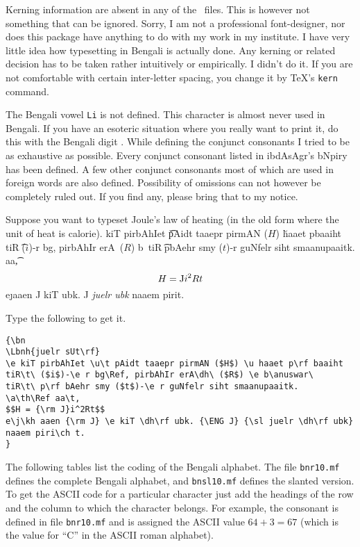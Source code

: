 Kerning information are absent in any of the \METAFONT\ files. This
is however not something that can be ignored. Sorry, I am not a professional
font-designer, nor does this package have anything to do with my work in my
institute. I have very little idea how typesetting in Bengali is actually done.
Any kerning or related decision has to be taken rather intuitively or
empirically. I didn't do it. If you are not comfortable with certain
inter-letter spacing, you change it by \TeX's {\tt \bs kern} command.

The Bengali vowel {\tt Li} is not defined. This character is almost never used
in Bengali. If you have an esoteric situation where you really want to print
it, do this with the Bengali digit {}. While defining the conjunct
consonants I tried to be as exhaustive as possible. Every conjunct
consonant listed in {\bn ibd\jf AsAgr}'s {\bn bN\Ref pir\ch y}
has been defined. A few other conjunct consonants most of which are
used in foreign words are also defined. Possibility of omissions can not
however be completely ruled out. If you find any, please bring that to
my notice.

Suppose you want to typeset Joule's law of heating (in the old form where
the unit of heat is calorie).
{\bn
{}
\e kiT pirbAhIet \u\t pAidt taaepr pirmAN ($H$) \u haaet p\rf baaiht
tiR\t\ ($i$)-\e r bg\Ref, pirbAhIr erA\dh\ ($R$) \e b\anuswar\
tiR\t\ p\rf bAehr smy ($t$)-\e r guNfelr siht smaanupaaitk.
\a\th\Ref aa\t,
$$H = {\rm J}i^2Rt$$
e\j\kh aaen {\rm J} \e kiT \dh\rf ubk. {\ENG J} {\sl juelr \dh\rf ubk}
naaem piri\ch t.
}

\noindent
Type the following to get it.
\begin{verbatim}
{\bn
\Lbnh{juelr sUt\rf}
\e kiT pirbAhIet \u\t pAidt taaepr pirmAN ($H$) \u haaet p\rf baaiht
tiR\t\ ($i$)-\e r bg\Ref, pirbAhIr erA\dh\ ($R$) \e b\anuswar\
tiR\t\ p\rf bAehr smy ($t$)-\e r guNfelr siht smaanupaaitk.
\a\th\Ref aa\t,
$$H = {\rm J}i^2Rt$$
e\j\kh aaen {\rm J} \e kiT \dh\rf ubk. {\ENG J} {\sl juelr \dh\rf ubk}
naaem piri\ch t.
}
\end{verbatim}

The following tables list the coding of the Bengali alphabet. The file
{\tt bnr10.mf} defines the complete Bengali alphabet, and
{\tt bnsl10.mf} defines the slanted version.
To get the ASCII code for a particular character just add the headings
of the row and the column to which the character belongs. For example,
the consonant {\bn \chh} is defined in file {\tt bnr10.mf} and is assigned
the ASCII value $64 + 3 = 67$ (which is the value for ``C'' in the ASCII
roman alphabet).

